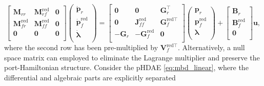 \begin{equation}
\begin{bmatrix}
\mathbf{M}_{rr} & \mathbf{M}_{rf}^{\text{red}} & \mathbf{0} \\ 
\mathbf{M}_{fr}^{\text{red}} & \mathbf{M}_{ff}^{\text{red}} & \mathbf{0} \\
\mathbf{0} & \mathbf{0} & \mathbf{0} \\
\end{bmatrix}
\begin{pmatrix}
\dot{\mathbf{p}}_r \\ \dot{\mathbf{p}}_f^{\text{red}} \\ \dot{\bm{\lambda}} \\ 
\end{pmatrix} = 
\begin{bmatrix}
\mathbf{0} & \mathbf{0} & \mathbf{G}_r^\top \\ 
\mathbf{0} & \mathbf{J}_{ff}^{\text{red}} & \mathbf{G}_f^{\text{red} \top} \\ 
-\mathbf{G}_r & -\mathbf{G}_f^{\text{red}} & \mathbf{0} \\
\end{bmatrix}
\begin{pmatrix}
\mathbf{p}_r \\ \mathbf{p}_f^{\text{red}} \\ {\bm{\lambda}} \\ 
\end{pmatrix} + 
\begin{bmatrix}
\mathbf{B}_r \\ \mathbf{B}_f^{\text{red}} \\ \mathbf{0} \\
\end{bmatrix}\mathbf{u},
\end{equation}
where the second row has been pre-multiplied by $\mathbf{V}_f^{\text{red} \top}$. Alternatively, a null space matrix can employed to eliminate the Lagrange multiplier and preserve the port-Hamiltonian structure. Consider the pHDAE \eqref{eq:mbd_linear}, where the differential and algebraic parts are explicitly separated

